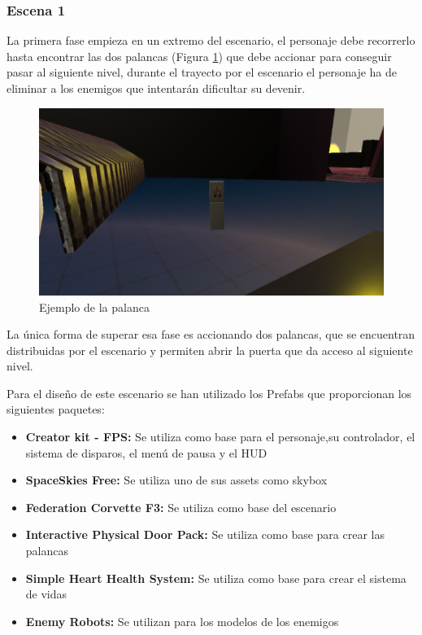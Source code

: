 \subsubsection{Escena 1}
La primera fase empieza en un extremo del escenario, el personaje debe recorrerlo hasta encontrar las dos palancas (Figura \ref{fig:Palanca}) que debe accionar para conseguir pasar al siguiente nivel, durante el trayecto por el escenario el personaje ha de eliminar a los enemigos que intentarán dificultar su devenir.

\begin{figure}[H]
	\centering
	\includegraphics[scale=0.75]{imagenes/Palanca.png}
	\caption{\label{fig:Palanca}Ejemplo de la palanca}
\end{figure}

La única forma de superar esa fase es accionando dos palancas, que se encuentran distribuidas por el escenario y permiten abrir la puerta que da acceso al siguiente nivel.

Para el diseño de este escenario se han utilizado los Prefabs que proporcionan los siguientes paquetes:
\begin{itemize}
	\item \textbf {Creator kit - FPS:} Se utiliza como base para el personaje,su controlador, el sistema de disparos, el menú de pausa y el HUD
	\item \textbf{SpaceSkies Free:} Se utiliza uno de sus assets como skybox
	\item \textbf{Federation Corvette F3:} Se utiliza como base del escenario
	\item \textbf{Interactive Physical Door Pack:} Se utiliza como base para crear las palancas
	\item \textbf{Simple Heart Health System:} Se utiliza como base para crear el sistema de vidas
	\item \textbf{Enemy Robots:} Se utilizan para los modelos de los enemigos
\end{itemize}


